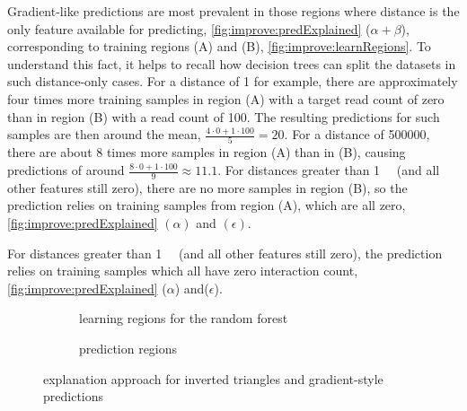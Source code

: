 Gradient-like predictions are most prevalent in those regions where distance is the only feature available for predicting,
\autoref{fig:improve:predExplained} ($\alpha + \beta$), corresponding to training regions (A) and (B), 
\autoref{fig:improve:learnRegions}.
To understand this fact, it helps to recall how decision trees can split the datasets in such distance-only cases.
For a distance of \SI{1}{\bp} for example, there are approximately four times more training samples
in region (A) with a target read count of zero than in region (B) with a read count of 100. 
The resulting predictions for such samples are then around the mean, $\frac{4 \cdot 0 + 1 \cdot 100}{5}=20$.
For a distance of \SI{500000}{\bp}, there are about 8 times more samples in region (A) than in (B), 
causing predictions of around \(\frac{8 \cdot 0 + 1 \cdot 100}{9} \approx 11.1 \).
For distances greater than \SI{1}{\mega\bp} (and all other features still zero), there are no more samples
in region (B), so the prediction relies on training samples from region (A), which are all
zero, \autoref{fig:improve:predExplained} $(\alpha)$ and $(\epsilon)$.

For distances greater than \SI{1}{\mega\bp} (and all other features still zero), the prediction relies on training samples which all have zero interaction 
count, \autoref{fig:improve:predExplained} ($\alpha$) and\;($\epsilon$).
\begin{figure}[ht]
\begin{subfigure}{\textwidth}
 \centering
 \caption{learning regions for the random forest}
 \label{fig:improve:learnRegions}
\end{subfigure}\vspace{3mm}
\begin{subfigure}{\textwidth}
 \centering
 \caption{prediction regions}
 \label{fig:improve:predExplained}
\end{subfigure}
\caption{explanation approach for inverted triangles and gradient-style predictions}
\end{figure}

